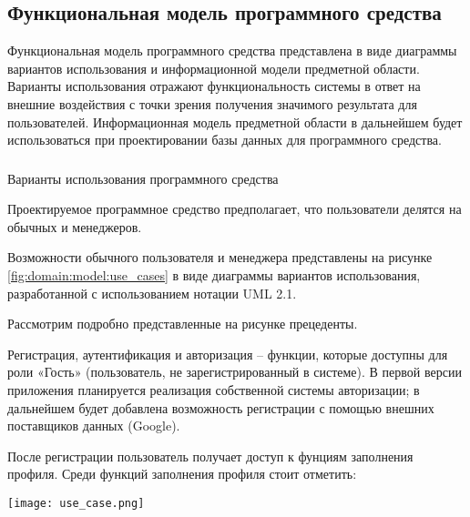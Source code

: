 \subsection{Функциональная модель программного средства}
\label{sec:domain:model}

Функциональная модель программного средства представлена в виде диаграммы вариантов использования и информационной
модели предметной области. Варианты использования отражают функциональность системы в ответ на внешние воздействия с
точки зрения получения значимого результата для пользователей. Информационная модель предметной области в
дальнейшем будет использоваться при проектировании базы данных для программного средства.

\subsubsection{} Варианты использования программного средства
\label{sec:domain:model:use_cases}

Проектируемое программное средство предполагает, что пользователи делятся на обычных и менеджеров.

Возможности обычного пользователя и менеджера представлены на рисунке \ref{fig:domain:model:use_cases} в виде
диаграммы вариантов использования, разработанной с использованием нотации UML 2.1.

Рассмотрим подробно представленные на рисунке прецеденты.

Регистрация, аутентификация и авторизация – функции, которые доступны для роли «Гость» (пользователь, не
зарегистрированный в системе). В первой версии приложения планируется реализация собственной системы авторизации; в
дальнейшем будет добавлена возможность регистрации с помощью внешних поставщиков данных (Google).

После регистрации пользователь получает доступ к фунциям заполнения профиля. Среди функций заполнения профиля стоит
отметить:

\begin{sidewaysfigure}
  \centering
    \texttt{[image: use\_case.png]} 
    \caption{Диаграмма вариантов использования ПС}
    \label{fig:domain:model:use_cases}
\end{sidewaysfigure}

